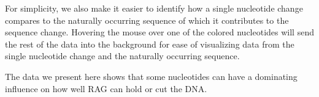 \documentclass[11pt, oneside]{article}   	%
\begin{document}
For simplicity, we also make it easier to identify how a single nucleotide change compares to the naturally occurring
sequence of which it contributes to the sequence change. Hovering the mouse over one of the colored nucleotides will send
the rest of the data into the background for ease of visualizing data from the single nucleotide change and the naturally
occurring sequence.

The data we present here shows that some nucleotides can have a dominating influence on how well RAG can hold or
cut the DNA.
\end{document}
